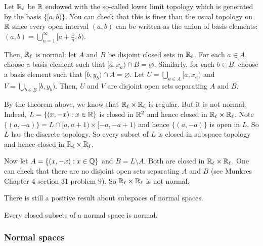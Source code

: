 \begin{example}
    Let $\mathbb{R}_\ell$ be $\mathbb{R}$ endowed with the so-called lower limit topology which is generated by the basis $\{[a,b)\}$. You can check that this is finer than the usual topology on $\mathbb{R}$ since every open interval $(a,b)$ can be written as the union of basis elements: $(a,b)=\bigcup_{n=1}^\infty [a+\frac{1}{n},b)$.

    Then, $\mathbb{R}_\ell$ is normal: let $A$ and $B$ be disjoint closed sets in $\mathbb{R}_\ell$. For each $a\in A$, choose a basis element such that $[a,x_a)\cap B=\varnothing$. Similarly, for each $b\in B$, choose a basis element such that $[b,y_b)\cap A=\varnothing$. Let $U=\bigcup_{a\in A} [a,x_a)$ and $V=\bigcup_{b\in B} [b,y_b)$. Then, $U$ and $V$ are disjoint open sets separating $A$ and $B$.

    By the theorem above, we know that $\mathbb{R}_\ell\times\mathbb{R}_\ell$ is regular. But it is not normal. Indeed, $L=\{(x,-x):x\in\mathbb{R}\}$ is closed in $\mathbb{R}^2$ and hence closed in $\mathbb{R}_\ell\times\mathbb{R}_\ell$. Note $\{(a,-a)\}=L\cap [a,a+1)\times [-a,-a+1)$ and hence $\{(a,-a)\}$ is open in $L$. So $L$ has the discrete topology. So every subset of $L$ is closed in subspace topology and hence closed in $\mathbb{R}_\ell\times\mathbb{R}_\ell$. 

    Now let $A=\{(x,-x):x\in\mathbb{Q}\}$ and $B=L\setminus A$. Both are closed in $\mathbb{R}_\ell\times\mathbb{R}_\ell$. One can check that there are no disjoint open sets separating $A$ and $B$ (see Munkres Chapter 4 section 31 problem 9). So $\mathbb{R}_\ell\times\mathbb{R}_\ell$ is not normal.
\end{example}

There is still a positive result about subspaces of  normal spaces.

\begin{proposition}
    Every closed subsets of a normal space is normal.
\end{proposition}

\subsubsection*{Normal spaces}

